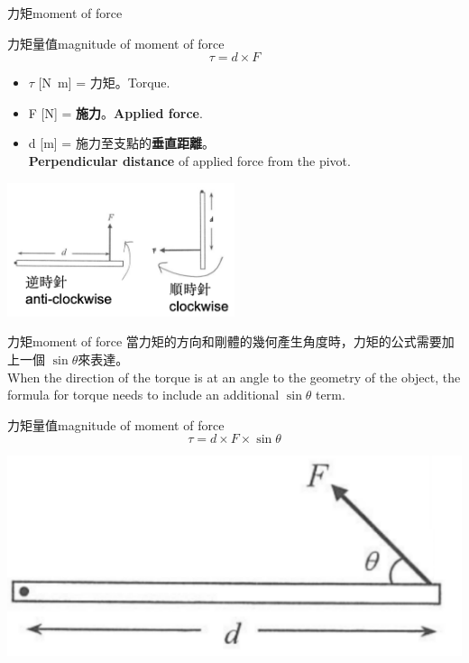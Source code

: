 \documentclass[beamer=true]{standalone}
\begin{document}
\begin{frame}{力矩moment of force}
    \begin{exampleblock}
        {力矩量值magnitude of moment of force}
        \begin{equation}
            \tau = d\times F
        \end{equation}
    \end{exampleblock}
    \begin{itemize}
        \item $\tau$ [\unit{N.m}] = 力矩。Torque.
        \item F [N] = \textbf{施力}。\textbf{Applied force}.
        \item d  [m] = 施力至支點的\textbf{垂直距離}。\\ \textbf{Perpendicular distance} of applied force from the pivot.
    \end{itemize}
    {\par\centering
    \includegraphics[width=0.5\textwidth]{assets/8db14dd2.png}
    \par}
\end{frame}

\begin{frame}{力矩moment of force}
    當力矩的方向和剛體的幾何產生角度時，力矩的公式需要加上一個 $\sin\theta$來表達。\\When the direction of the torque is at an angle to the geometry of the object, the formula for torque needs to include an additional $\sin\theta$ term.
    \begin{alertblock}
        {力矩量值magnitude of moment of force}
        \begin{equation}
            \tau = d\times F \times\sin \theta
        \end{equation}
    \end{alertblock}
    \bigskip
    {\par\centering
        \includegraphics[width=.4\textwidth]{assets/dfd826ba.png}
        \par}
\end{frame}
\end{document}
